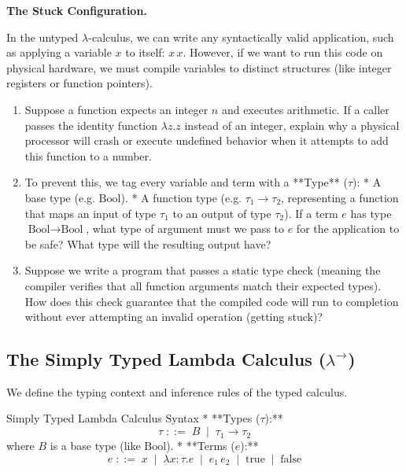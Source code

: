 \documentclass[12pt, a4paper]{book}
\begin{document}
\begin{puzzlebox}
\textbf{The Stuck Configuration.}

In the untyped $\lambda$-calculus, we can write any syntactically valid application, such as applying a variable $x$ to itself: $x \, x$.
However, if we want to run this code on physical hardware, we must compile variables to distinct structures (like integer registers or function pointers).
\begin{enumerate}[label=(\alph*), leftmargin=*]
  \item Suppose a function expects an integer $n$ and executes arithmetic. If a caller passes the identity function $\lambda z. z$ instead of an integer, explain why a physical processor will crash or execute undefined behavior when it attempts to add this function to a number.
  \item To prevent this, we tag every variable and term with a **Type** ($\tau$):
        * A base type (e.g. $\text{Bool}$).
        * A function type (e.g. $\tau_1 \to \tau_2$, representing a function that maps an input of type $\tau_1$ to an output of type $\tau_2$).
        If a term $e$ has type $\text{Bool} \to \text{Bool}$, what type of argument must we pass to $e$ for the application to be safe? What type will the resulting output have?
  \item Suppose we write a program that passes a static type check (meaning the compiler verifies that all function arguments match their expected types).
        How does this check guarantee that the compiled code will run to completion without ever attempting an invalid operation (getting stuck)?
\end{enumerate}
\end{puzzlebox}

\subsection{The Simply Typed Lambda Calculus ($\lambda^\to$)}

We define the typing context and inference rules of the typed calculus.

\begin{namedconcept}{Simply Typed Lambda Calculus Syntax}
* **Types ($\tau$):**
  \[
    \tau \;::=\; B \;\mid\; \tau_1 \to \tau_2
  \]
  where $B$ is a base type (like $\text{Bool}$).
* **Terms ($e$):**
  \[
    e \;::=\; x \;\mid\; \lambda x : \tau. e \;\mid\; e_1 \, e_2 \;\mid\; \text{true} \;\mid\; \text{false}
  \]
\end{namedconcept}
\end{document}
